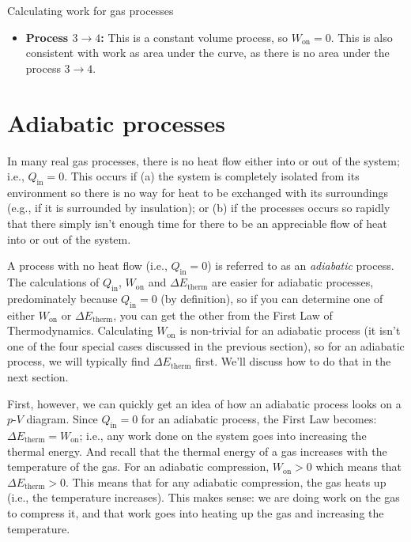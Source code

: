 \begin{example}{Calculating work for gas processes}
\begin{itemize}
\item {\bf Process $3 \rightarrow 4$:} This is a constant volume process,
so $W_\text{on} = 0$. This is also consistent with work as area under the curve,
as there is no area under the process $3 \rightarrow 4$.
\end{itemize}
\end{example}

\section{Adiabatic processes}

In many real gas processes, there is no heat flow either into or out
of the system; i.e., $Q_\text{in} = 0$. This occurs if (a) the system
is completely isolated from its environment so there is no way for
heat to be exchanged with its surroundings (e.g., if it is surrounded
by insulation); or (b) if the processes occurs so rapidly that there
simply isn't enough time for there to be an appreciable flow of heat
into or out of the system.

A process with no heat flow (i.e., $Q_\text{in} = 0$) is referred to as an
{\em adiabatic} process. The calculations of $Q_\text{in}$, $W_\text{on}$ and
$\Delta E_\text{therm}$ are easier for adiabatic processes, predominately because
$Q_\text{in} = 0$ (by definition), so if you can determine one of either
$W_\text{on}$ or $\Delta E_\text{therm}$, you can get the other from the First
Law of Thermodynamics.
Calculating $W_\text{on}$ is non-trivial for an adiabatic process (it isn't
one of the four special cases discussed in the previous section), so
for an adiabatic process, we will typically find $\Delta E_\text{therm}$  first.
We'll discuss how to do that in the next section. 

First, however, we
can quickly get an idea of how an adiabatic process looks on a $p$-$V$
diagram. Since $Q_\text{in} = 0$ for an adiabatic process, the First Law
becomes:  $\Delta E_\text{therm} = W_\text{on}$; i.e., any work done on the system
goes into increasing the thermal energy.  And recall that the thermal
energy of a gas increases with the temperature of the gas.
For an adiabatic compression, $W_\text{on} > 0$
which means that $\Delta E_\text{therm} > 0$.  This means that for any
adiabatic compression, the gas heats up (i.e., the temperature increases).
This makes sense:  we are doing work on the gas to compress it, and that
work goes into heating up the gas and increasing the temperature.

